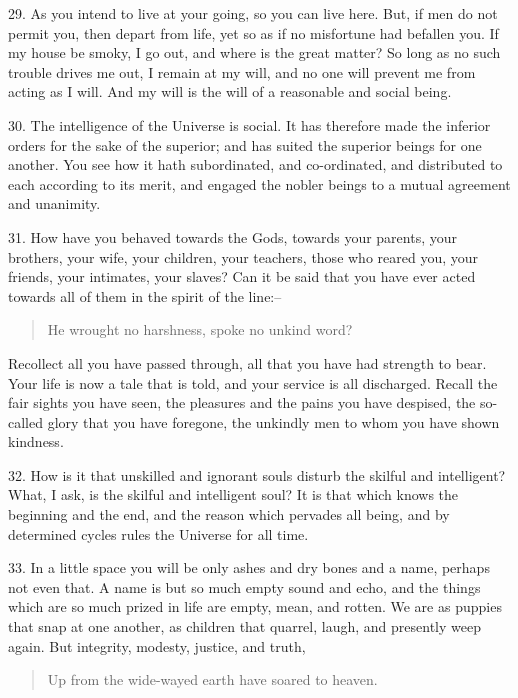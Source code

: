 \documentclass{book}
\begin{document}
29. As you intend to live at your going, so you can live here. But, if
men do not permit you, then depart from life, yet so as if no
misfortune had befallen you. If my house be smoky, I go out, and where
is the great matter? So long as no such trouble drives me out, I
remain at my will, and no one will prevent me from acting as I
will. And my will is the will of a reasonable and social being.

30. The intelligence of the Universe is social. It has therefore made
the inferior orders for the sake of the superior; and has suited the
superior beings for one another. You see how it hath subordinated, and
co-ordinated, and distributed to each according to its merit, and
engaged the nobler beings to a mutual agreement and unanimity.

31. How have you behaved towards the Gods, towards your parents, your
brothers, your wife, your children, your teachers, those who reared
you, your friends, your intimates, your slaves? Can it be said that
you have ever acted towards all of them in the spirit of the line:--

\begin{quote}
He wrought no harshness, spoke no unkind word?
\end{quote}

Recollect all you have passed through, all that you have had strength
to bear. Your life is now a tale that is told, and your service is all
discharged. Recall the fair sights you have seen, the pleasures and
the pains you have despised, the so-called glory that you have
foregone, the unkindly men to whom you have shown kindness.

32. How is it that unskilled and ignorant souls disturb the skilful
and intelligent? What, I ask, is the skilful and intelligent soul? It
is that which knows the beginning and the end, and the reason which
pervades all being, and by determined cycles rules the Universe for
all time.

33. In a little space you will be only ashes and dry bones and a name,
perhaps not even that. A name is but so much empty sound and echo, and
the things which are so much prized in life are empty, mean, and
rotten. We are as puppies that snap at one another, as children that
quarrel, laugh, and presently weep again. But integrity, modesty,
justice, and truth,

\begin{quote}
Up from the wide-wayed earth have soared to heaven.
\end{quote}
\end{document}
